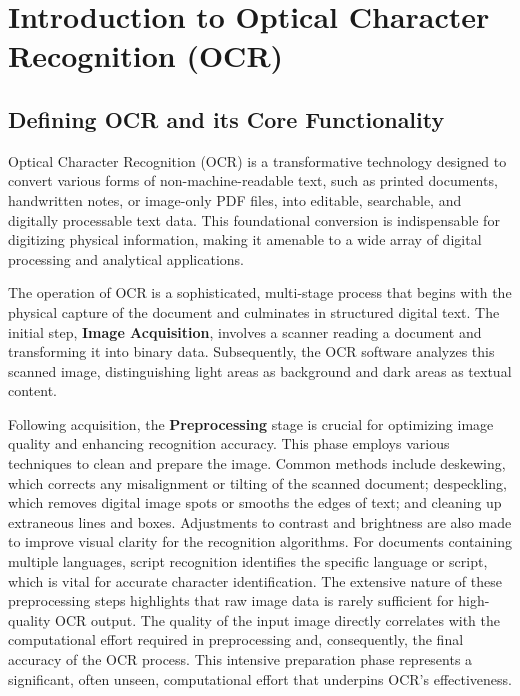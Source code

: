 \section{Introduction to Optical Character Recognition (OCR)}
\label{sec:intro-ocr}

\subsection{Defining OCR and its Core Functionality}

Optical Character Recognition (OCR) is a transformative technology designed to convert various forms of non-machine-readable text, such as printed documents, handwritten notes, or image-only PDF files, into editable, searchable, and digitally processable text data. This foundational conversion is indispensable for digitizing physical information, making it amenable to a wide array of digital processing and analytical applications.

The operation of OCR is a sophisticated, multi-stage process that begins with the physical capture of the document and culminates in structured digital text. The initial step, \textbf{Image Acquisition}, involves a scanner reading a document and transforming it into binary data. Subsequently, the OCR software analyzes this scanned image, distinguishing light areas as background and dark areas as textual content.

Following acquisition, the \textbf{Preprocessing} stage is crucial for optimizing image quality and enhancing recognition accuracy. This phase employs various techniques to clean and prepare the image. Common methods include deskewing, which corrects any misalignment or tilting of the scanned document; despeckling, which removes digital image spots or smooths the edges of text; and cleaning up extraneous lines and boxes. Adjustments to contrast and brightness are also made to improve visual clarity for the recognition algorithms. For documents containing multiple languages, script recognition identifies the specific language or script, which is vital for accurate character identification. The extensive nature of these preprocessing steps highlights that raw image data is rarely sufficient for high-quality OCR output. The quality of the input image directly correlates with the computational effort required in preprocessing and, consequently, the final accuracy of the OCR process. This intensive preparation phase represents a significant, often unseen, computational effort that underpins OCR's effectiveness.

